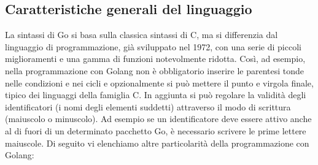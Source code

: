 \subsection{Caratteristiche generali del linguaggio}
La sintassi di Go si basa sulla classica sintassi di C, ma si differenzia dal linguaggio di programmazione, già sviluppato nel 1972, con una serie di piccoli miglioramenti e una gamma di funzioni notevolmente ridotta. Così, ad esempio, nella programmazione con Golang non è obbligatorio inserire le parentesi tonde nelle condizioni e nei cicli e opzionalmente si può mettere il punto e virgola finale, tipico dei linguaggi della famiglia C.
In aggiunta si può regolare la validità degli identificatori (i nomi degli elementi suddetti) attraverso il modo di scrittura (maiuscolo o minuscolo). Ad esempio se un identificatore deve essere attivo anche al di fuori di un determinato pacchetto Go, è necessario scrivere le prime lettere maiuscole. Di seguito vi elenchiamo altre particolarità della programmazione con Golang:
